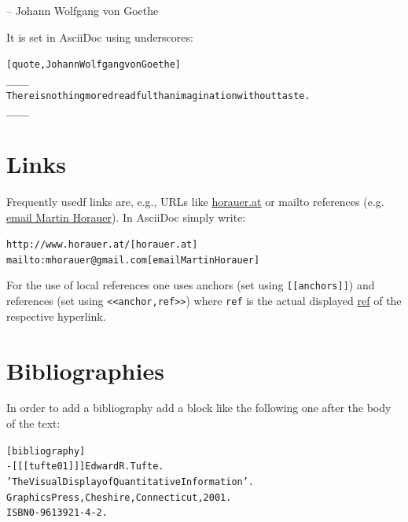 \documentclass[10pt,a4paper,oneside,BCOR5mm]{scrartcl}
\begin{document}
\begin{flushright}
-- Johann Wolfgang von Goethe
\end{flushright}
 \par\noindent{}It is set in AsciiDoc using underscores:
\begin{alltt}[quote, Johann Wolfgang von Goethe]
\_{}\_{}\_{}\_{}
There is nothing more dreadful than imagination without taste.
\_{}\_{}\_{}\_{}\end{alltt}
\hypertarget{_links}{}
\section{Links}
\label{_links}
 \par\noindent{}Frequently usedf links are, e.g., URLs like \href{http://www.horauer.at/}{horauer.at} or mailto references (e.g. \href{mailto:mhorauer@gmail.com}{email Martin Horauer}). In AsciiDoc simply write:
\begin{alltt}http://www.horauer.at/[horauer.at]
mailto:mhorauer@gmail.com[email Martin Horauer]\end{alltt}
 \par\noindent{}For the use of local references one uses \label{anchors}\hypertarget{anchors}{anchors} (set using \texttt{[[anchors]]}) and references (set using \texttt{\textless{}\textless{}anchor,ref\textgreater{}\textgreater{}}) where \texttt{ref} is the actual displayed \hyperlink{anchor}{ref} of the respective hyperlink.
\hypertarget{_bibliographies}{}
\section{Bibliographies}
\label{_bibliographies}
 \par\noindent{}In order to add a bibliography add a block like the following one after the body of the text:
\begin{alltt}[bibliography]
- [[[tufte01]]] Edward R. Tufte.
'The Visual Display of Quantitative Information'.
Graphics Press, Cheshire, Connecticut, 2001.
ISBN 0-9613921-4-2.\end{alltt}
\begin{addmargin*}[0em]{0em}
\vspace*{2mm}
\vspace*{2mm}
\end{addmargin*}
\hypertarget{_indices}{}
\end{document}
